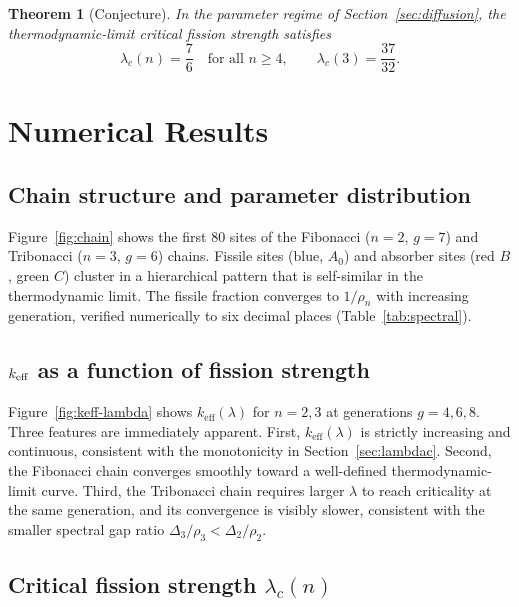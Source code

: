 \documentclass[11pt]{article}
\newtheorem{theorem}{Theorem}[section]
\newcommand{\keff}{k_{\mathrm{eff}}}
\newcommand{\lc}{\lambda_c}
\newcommand{\rhon}{\rho_n}
\begin{document}
\begin{theorem}[Conjecture]
In the parameter regime of Section~\ref{sec:diffusion}, the
thermodynamic-limit critical fission strength satisfies
\begin{equation}
  \lc(n) = \frac{7}{6} \quad\text{for all } n \geq 4,
  \qquad
  \lc(3) = \frac{37}{32}.
  \label{eq:saturation-conjecture}
\end{equation}
\end{theorem}

\section{Numerical Results}
\label{sec:numerics}

\subsection{Chain structure and parameter distribution}
\label{sec:chain-structure}

Figure~\ref{fig:chain} shows the first 80 sites of the Fibonacci ($n=2$,
$g=7$) and Tribonacci ($n=3$, $g=6$) chains.
Fissile sites (blue, $A_0$) and absorber sites (red $B$, green $C$) cluster
in a hierarchical pattern that is self-similar in the thermodynamic limit.
The fissile fraction converges to $1/\rhon$ with increasing generation,
verified numerically to six decimal places (Table~\ref{tab:spectral}).

\subsection{$k_{\rm eff}$ as a function of fission strength}
\label{sec:keff-lambda}

Figure~\ref{fig:keff-lambda} shows $\keff(\lambda)$ for $n=2,3$ at
generations $g = 4, 6, 8$.
Three features are immediately apparent.
First, $\keff(\lambda)$ is strictly increasing and continuous, consistent
with the monotonicity in Section~\ref{sec:lambdac}.
Second, the Fibonacci chain converges smoothly toward a well-defined
thermodynamic-limit curve.
Third, the Tribonacci chain requires larger $\lambda$ to reach criticality
at the same generation, and its convergence is visibly slower, consistent
with the smaller spectral gap ratio $\Delta_3/\rho_3 < \Delta_2/\rho_2$.

\subsection{Critical fission strength $\lc(n)$}
\label{sec:lc-results}
\end{document}
